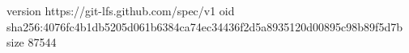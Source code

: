 version https://git-lfs.github.com/spec/v1
oid sha256:4076fc4b1db5205d061b6384ca74ec34436f2d5a8935120d00895c98b89f5d7b
size 87544
